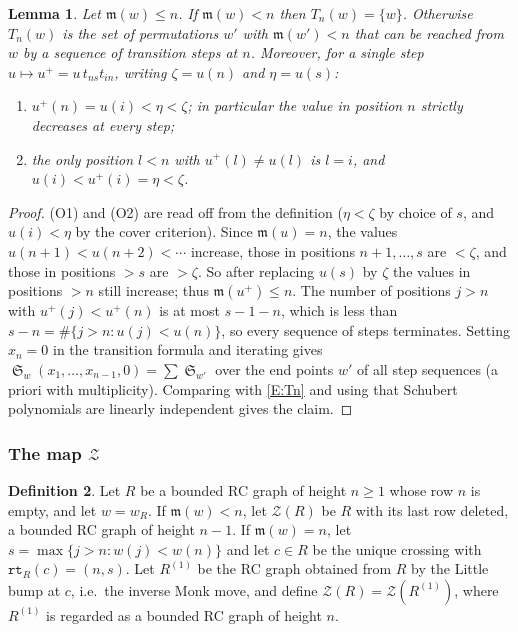 \documentclass{amsart}
\newtheorem{lemma}{Lemma}[subsection]
\theoremstyle{definition}
\newtheorem{definition}[lemma]{Definition}
\theoremstyle{remark}
\numberwithin{equation}{subsection}
\DeclareMathOperator{\sch}{\mathfrak{S}}
\newcommand{\wof}[1]{w_{#1}}
\newcommand{\rtt}{\mathtt{rt}}
\newcommand{\zeromap}{\mathcal{Z}}
\newcommand{\maxd}{\mathfrak{m}}
\begin{document}
\begin{lemma}\label{L:leaves}
Let $\maxd(w)\le n$. If $\maxd(w)<n$ then $T_n(w)=\{w\}$. Otherwise $T_n(w)$ is the set of permutations $w'$ with
$\maxd(w')<n$ that can be reached from $w$ by a sequence of transition steps at $n$.
Moreover, for a single step $u\mapsto u^+=u\,t_{ns}t_{in}$, writing $\zeta=u(n)$ and $\eta=u(s)$:
\begin{enumerate}
\item[(O1)] $u^+(n)=u(i)<\eta<\zeta$; in particular the value in position $n$ strictly decreases at every step;
\item[(O2)] the only position $l<n$ with $u^+(l)\ne u(l)$ is $l=i$, and $u(i)<u^+(i)=\eta<\zeta$.
\end{enumerate}
\end{lemma}
\begin{proof}
(O1) and (O2) are read off from the definition ($\eta<\zeta$ by choice of $s$, and $u(i)<\eta$ by the cover criterion).
Since $\maxd(u)=n$, the values $u(n+1)<u(n+2)<\cdots$ increase, those in positions $n+1,\dots,s$ are $<\zeta$, and those in positions $>s$ are $>\zeta$.
So after replacing $u(s)$ by $\zeta$ the values in positions $>n$ still increase; thus $\maxd(u^+)\le n$.
The number of positions $j>n$ with $u^+(j)<u^+(n)$ is at most $s-1-n$, which is less than $s-n=\#\{j>n:u(j)<u(n)\}$,
so every sequence of steps terminates. Setting $x_n=0$ in the transition formula and iterating gives
$\sch_w(x_1,\dots,x_{n-1},0)=\sum\sch_{w'}$ over the end points $w'$ of all step sequences (a priori with multiplicity).
Comparing with \eqref{E:Tn} and using that Schubert polynomials are linearly independent gives the claim.
\end{proof}

\subsubsection*{The map $\zeromap$}

\begin{definition}\label{definition:zeromap}
Let $R$ be a bounded RC graph of height $n\geq 1$ whose row $n$ is empty, and let $w=\wof R$. If $\maxd(w)<n$, let $\zeromap(R)$ be $R$ with its last row deleted, a bounded RC graph of height $n-1$. If $\maxd(w)=n$, let $s=\max\{j>n: w(j)<w(n)\}$ and let $c\in R$ be the unique crossing with $\rtt_R(c)=(n,s)$. Let $R^{(1)}$ be the RC graph obtained from $R$ by the Little bump at $c$, i.e.\ the inverse Monk move, and define $\zeromap(R)=\zeromap(R^{(1)})$, where $R^{(1)}$ is regarded as a bounded RC graph of height $n$.
\end{definition}
\end{document}
